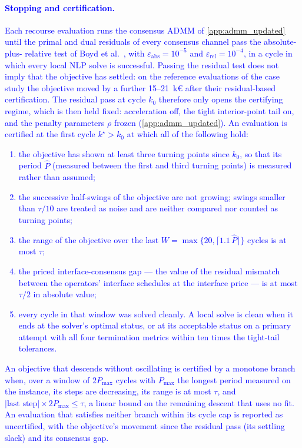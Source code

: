 \textcolor{blue}{\paragraph{Stopping and certification.} Each recourse evaluation runs the consensus ADMM of
\ref{app:admm_updated} until the primal and dual residuals of every consensus channel pass the absolute-plus-
relative test of Boyd et al.~\cite{boyd_admm_2011}, with $\varepsilon_{\text{abs}} = 10^{-5}$ and
$\varepsilon_{\text{rel}} = 10^{-4}$, in a cycle in which every local NLP solve is successful. Passing the
residual test does not imply that the objective has settled: on the reference evaluations of the case study the
objective moved by a further 15--21~k\euro{} after their residual-based certification. The residual pass at
cycle $k_0$ therefore only opens the certifying regime, which is then held fixed: acceleration off, the
tight interior-point tail on, and the penalty parameters $\rho$ frozen (\ref{app:admm_updated}). An
evaluation is certified at the first cycle $k^{\star} > k_0$ at which all of the following hold:}

\textcolor{blue}{
\begin{enumerate}
    \item the objective has shown at least three turning points since $k_0$, so that its period $\hat{P}$
    (measured between the first and third turning points) is measured rather than assumed;
    \item the successive half-swings of the objective are not growing; swings smaller than $\tau/10$ are
    treated as noise and are neither compared nor counted as turning points;
    \item the range of the objective over the last $W = \max\{20, \lceil 1.1\,\hat{P} \rceil\}$ cycles is at
    most $\tau$;
    \item the priced interface-consensus gap --- the value of the residual mismatch between the operators'
    interface schedules at the interface price --- is at most $\tau/2$ in absolute value;
    \item every cycle in that window was solved cleanly. A local solve is clean when it ends at the solver's
    optimal status, or at its acceptable status on a primary attempt with all four termination metrics within
    ten times the tight-tail tolerances.
\end{enumerate}
}

\textcolor{blue}{An objective that descends without oscillating is certified by a monotone branch when, over a
window of $2P_{\max}$ cycles with $P_{\max}$ the longest period measured on the instance, its steps are
decreasing, its range is at most $\tau$, and $|\text{last step}| \times 2P_{\max} \le \tau$, a linear bound on
the remaining descent that uses no fit. An evaluation that satisfies neither branch within its cycle cap is
reported as uncertified, with the objective's movement since the residual pass (its settling slack) and its
consensus gap.}

